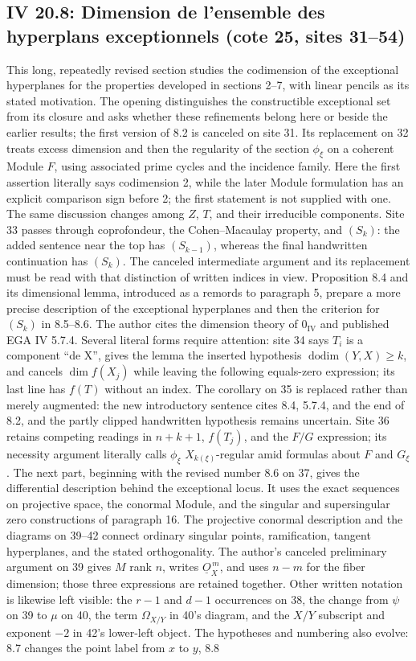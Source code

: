 \documentclass[10pt,a4paper]{article}
\begin{document}
\subsection*{IV 20.8: Dimension de l'ensemble des hyperplans exceptionnels (cote 25, sites 31--54)}
This long, repeatedly revised section studies the codimension of the exceptional hyperplanes for the properties developed in sections 2--7, with linear pencils as its stated motivation. The opening distinguishes the constructible exceptional set from its closure and asks whether these refinements belong here or beside the earlier results; the first version of 8.2 is canceled on site 31. Its replacement on 32 treats excess dimension and then the regularity of the section $\phi_\xi$ on a coherent Module $F$, using associated prime cycles and the incidence family. Here the first assertion literally says codimension 2, while the later Module formulation has an explicit comparison sign before 2; the first statement is not supplied with one. The same discussion changes among $Z$, $T$, and their irreducible components. Site 33 passes through coprofondeur, the Cohen--Macaulay property, and $(S_k)$: the added sentence near the top has $(S_{k-1})$, whereas the final handwritten continuation has $(S_k)$. The canceled intermediate argument and its replacement must be read with that distinction of written indices in view. Proposition 8.4 and its dimensional lemma, introduced as a remords to paragraph 5, prepare a more precise description of the exceptional hyperplanes and then the criterion for $(S_k)$ in 8.5--8.6. The author cites the dimension theory of $0_{\mathrm{IV}}$ and published EGA IV 5.7.4. Several literal forms require attention: site 34 says $T_i$ is a component ``de X'', gives the lemma the inserted hypothesis $\operatorname{dodim}(Y,X)\geq k$, and cancels $\dim f(X_j)$ while leaving the following equals-zero expression; its last line has $f(T)$ without an index. The corollary on 35 is replaced rather than merely augmented: the new introductory sentence cites 8.4, 5.7.4, and the end of 8.2, and the partly clipped handwritten hypothesis remains uncertain. Site 36 retains competing readings in $n+k+1$, $f(T_j)$, and the $F/G$ expression; its necessity argument literally calls $\phi_\xi$ $X_{k(\xi)}$-regular amid formulas about $F$ and $G_\xi$. The next part, beginning with the revised number 8.6 on 37, gives the differential description behind the exceptional locus. It uses the exact sequences on projective space, the conormal Module, and the singular and supersingular zero constructions of paragraph 16. The projective conormal description and the diagrams on 39--42 connect ordinary singular points, ramification, tangent hyperplanes, and the stated orthogonality. The author's canceled preliminary argument on 39 gives $M$ rank $n$, writes $\underline{O}_X^{\,m}$, and uses $n-m$ for the fiber dimension; those three expressions are retained together. Other written notation is likewise left visible: the $r-1$ and $d-1$ occurrences on 38, the change from $\psi$ on 39 to $\mu$ on 40, the term $\Omega_{X/Y}$ in 40's diagram, and the $X/Y$ subscript and exponent $-2$ in 42's lower-left object. The hypotheses and numbering also evolve: 8.7 changes the point label from $x$ to $y$, 8.8 
\end{document}
